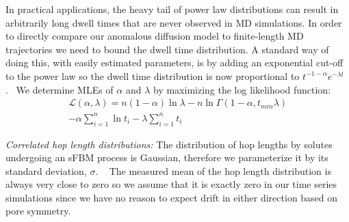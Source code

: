 \documentclass[journal=ancac3,manuscript=article,layout=twocolumn]{achemso}
\begin{document}
  In practical applications, the heavy tail of power law distributions can result in 
  arbitrarily long dwell times that are never observed in MD simulations. 
  In order to directly compare our anomalous diffusion model to finite-length MD 
  trajectories we need to bound the dwell time distribution. A standard way of 
  doing this, with easily estimated parameters, is by adding an exponential 
  cut-off to the power law so the dwell time distribution is now proportional 
  to $t^{-1 - \alpha}e^{-\lambda t}$.~\cite{newman_power_2005,clauset_power-law_2009}  %
  We determine MLEs of $\alpha$ and $\lambda$ by maximizing the log 
  likelihood function:~\cite{clauset_power-law_2009}
  \begin{equation}
  	\begin{split}
    \mathcal{L}(\alpha, \lambda) = n(1 - \alpha)\ln\lambda - n\ln\Gamma(1 - \alpha, t_{min}\lambda) \\
    -\alpha\sum_{i=1}^{n}\ln t_i - \lambda\sum_{i=1}^n t_i
    \end{split}
  \label{eqn:powerlaw_cutoff_likelihood}
  \end{equation}
  
  \textit{Correlated hop length distributions:} The distribution of hop 
  lengths by solutes undergoing an sFBM process is Gaussian, therefore we 
  parameterize it by its standard deviation, $\sigma$.
  ~\cite{metzler_random_2000, metzler_anomalous_2014,neusius_subdiffusion_2009}
  The measured mean of the hop length distribution is always very close to zero so
  we assume that it is exactly zero in our time series simulations since we have 
  no reason to expect drift in either direction based on pore symmetry.
\end{document}

